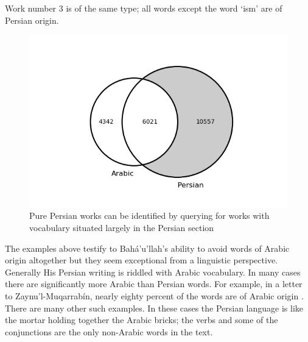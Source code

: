 \documentclass[12pt, oneside]{report}
\begin{document}
Work number 3 is of the same type; all words except the word `ism' are of Persian origin.
\begin{figure}
	\includegraphics[width=\linewidth]{figures/venn-persian.png}
	\caption[Venn diagram with Persian section highlighted]{Pure Persian works can be identified by querying for works with vocabulary situated largely in the Persian section}\label{fig:venn-pers}
\end{figure}
\par
The examples above testify to Bah\'{a}'u'llah's ability to avoid words of Arabic origin altogether but they seem exceptional from a linguistic perspective.
Generally His Persian writing is riddled with Arabic vocabulary.
In many cases there are significantly more Arabic than Persian words.
For example, in a letter to Zaynu'l-Muqarrab\'{i}n, nearly eighty percent of the words are of Arabic origin \cite{bahaullah_muntakhabati-az_163}.
There are many other such examples.
In these cases the Persian language is like the mortar holding together the Arabic bricks; the verbs and some of the conjunctions are the only non-Arabic words in the text.
\end{document}
